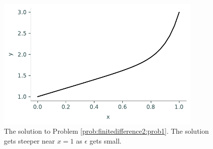 \begin{figure}[h]
\centering
\includegraphics[width=10cm]{figures/figure2.pdf}
\caption{The solution to Problem \ref{prob:finitedifference2:prob1}.
The solution gets steeper near $x = 1$ as $\epsilon $ gets small.}
\end{figure}

